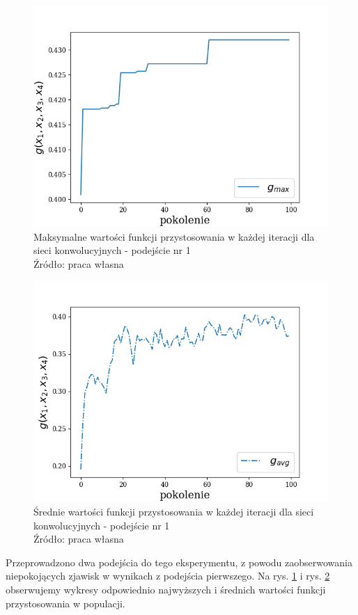 \begin{figure}[h!tb]
	 \centering
	 \includegraphics[width = 0.9\linewidth]{img/cnn_maxes_first}
	 \caption{Maksymalne wartości funkcji przystosowania w każdej iteracji dla sieci konwolucyjnych - podejście nr 1\\
              Źródło: praca własna}
	 \label{fig:cnn_maxes_first}
\end{figure}

\begin{figure}[h!tb]
	 \centering
	 \includegraphics[width = 0.9\linewidth]{img/cnn_means_first}
	 \caption{Średnie wartości funkcji przystosowania w każdej iteracji dla sieci konwolucyjnych - podejście nr 1\\
              Źródło: praca własna}
	 \label{fig:cnn_means_first}
\end{figure}

Przeprowadzono dwa podejścia do tego eksperymentu, z powodu zaobserwowania niepokojących zjawisk w wynikach z podejścia pierwszego.
Na rys. \ref{fig:cnn_maxes_first} i rys. \ref{fig:cnn_means_first} obserwujemy wykresy odpowiednio najwyższych i średnich wartości funkcji przystosowania w populacji.

